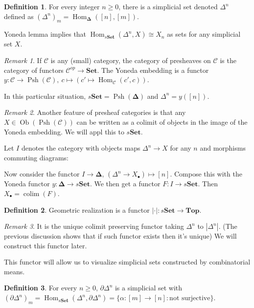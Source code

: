 \documentclass{article}
\theoremstyle{definition}
\newtheorem{defn}{Definition}[section]
\theoremstyle{remark}
\newtheorem{rem}{Remark}
\theoremstyle{plain}
\newcommand{\Hom}{\operatorname{Hom}}
\newcommand{\btop}{\mathbf{Top}}
\newcommand{\bdel}{\mathbf{\Delta}}
\newcommand{\bset}{\mathbf{Set}}
\begin{document}
\begin{defn}
    For every integer $n\ge 0$, there is a simplicial set denoted $\Delta^n$ defined as $(\Delta^n)_m=\Hom_\bdel([n],[m])$.
\end{defn}
Yoneda lemma implies that $\Hom_{s\bset}(\Delta^n,X)\cong X_n$ as sets for any simplicial set $X$.
\begin{rem}
    If $\mathscr{C}$ is any (small) category, the category of presheaves on $\mathscr C$ is the category of functors $\mathscr C^{op}\to\bset$. The Yoneda embedding is a functor $y:\mathscr C\to\operatorname{Psh}(\mathscr C),\ c\mapsto (c'\mapsto \Hom_{\mathscr C}(c',c))$.

    In this particular situation, $s\bset=\operatorname{Psh}(\bdel)$ and $\Delta^n=y([n])$.
\end{rem}
\begin{rem}
    Another feature of presheaf categories is that any $X\in\operatorname{Ob}(\operatorname{Psh}(\mathscr C))$ can be written as a colimit of objects in the image of the Yoneda embedding. We will appl this to $s\bset$.
\end{rem}
Let $I$ denotes the category with objects maps $\Delta^n\to X$ for any $n$ and morphisms commuting diagrams:
\begin{center}
\end{center}

Now consider the functor $I\to\bdel$, $(\Delta^n\to X_\bullet)\mapsto [n]$. Compose this with the Yoneda functor $y:\bdel\to s\bset$. We then get a functor $F:I\to s\bset$. Then $X_\bullet=\operatorname{colim}(F)$.


\begin{defn}
    Geometric realization is a functor $|\cdot |:s\bset\to\btop$.
\end{defn}
\begin{rem}
    It is the unique colimit preserving functor taking $\Delta^n$ to $|\Delta^n|$. (The previous discussion shows that if such functor exists then it's unique) We will construct this functor later.
\end{rem}
This functor will allow us to visualize simplicial sets constructed by combinatorial means.
\begin{defn}
    For every $n\ge0$, $\partial\Delta^n$ is a simplicial set with $(\partial \Delta^n)_m=\Hom_{s\bset}(\Delta^n,\partial\Delta^n)=\{\alpha:[m]\to[n]:\text{not surjective}\}$.
\end{defn}
\end{document}
